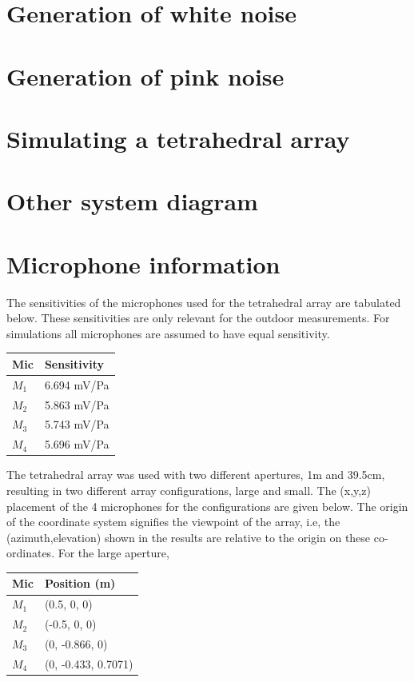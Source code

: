 \section{Generation of white noise}

\section{Generation of pink noise}

\section{Simulating a tetrahedral array}

\section{Other system diagram}


\section{Microphone information}\label{app:micLocs}
The sensitivities of the microphones used for the tetrahedral array are tabulated below. These sensitivities are only relevant for the outdoor measurements. For simulations all microphones are assumed to have equal sensitivity.
\begin{table}[H]
\centering
    \begin{tabular}{ll} \toprule
	{Mic}	&	{Sensitivity}\\
	    \bottomrule 
	    $M_1$   &   6.694 mV/Pa                   \\
	    $M_2$   &   5.863 mV/Pa                   \\
	    $M_3$   &   5.743 mV/Pa                   \\
		$M_4$   &   5.696 mV/Pa                   \\
		\bottomrule 
	\end{tabular}
\end{table}
The tetrahedral array was used with two different apertures, 1m and 39.5cm, resulting in two different array configurations, large and small. The (x,y,z) placement of the 4 microphones for the configurations are given below. The origin of the coordinate system signifies the viewpoint of the array, i.e, the (azimuth,elevation) shown in the results are relative to the origin on these co-ordinates.
For the large aperture,
\begin{table}[H]
\centering
    \begin{tabular}{ll} \toprule
	{Mic}	&	{Position (m)}\\
	    \bottomrule 
     $M_1$   &   (0.5, 0, 0) \\
     $M_2$   &   (-0.5, 0, 0) \\
     $M_3$   &   (0, -0.866, 0) \\
     $M_4$   &   (0, -0.433, 0.7071) \\
	\bottomrule 
	\end{tabular}
\end{table}

